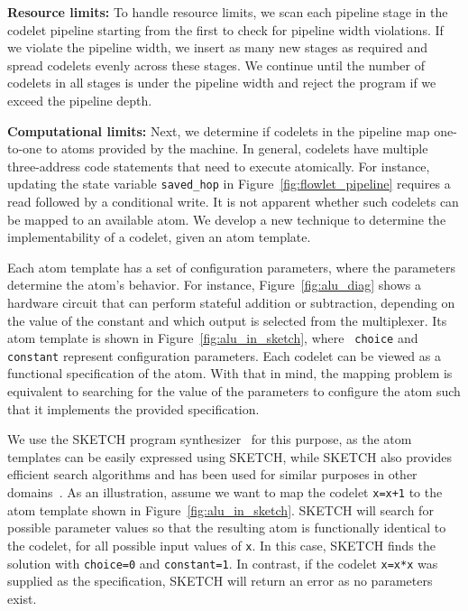 \textbf{Resource limits:} To handle resource limits, we scan each pipeline
stage in the codelet pipeline starting from the first to check for pipeline
width violations.  If we violate the pipeline width, we insert as many new
stages as required and spread codelets evenly across these stages.  We continue
until the number of codelets in all stages is under the pipeline width and
reject the program if we exceed the pipeline depth.

\textbf{Computational limits:} Next, we determine if codelets in the pipeline
map one-to-one to atoms provided by the \absmachine machine. In general,
codelets have multiple three-address code statements that need to execute
atomically. For instance, updating the state variable \texttt{saved\_hop} in
Figure~\ref{fig:flowlet_pipeline} requires a read followed by a conditional
write.  It is not apparent whether such codelets can be mapped to an available
atom. We develop a new technique to determine the implementability of a codelet,
given an atom template.

Each atom template has a set of configuration parameters, where the parameters
determine the atom's behavior.  For instance, Figure~\ref{fig:alu_diag} shows a
hardware circuit that can perform stateful addition or subtraction, depending
on the value of the constant and which output is selected from the multiplexer.
Its atom template is shown in Figure~\ref{fig:alu_in_sketch}, where {\tt
choice} and {\tt constant} represent configuration parameters.  Each codelet
can be viewed as a functional specification of the atom.  With that in mind,
the mapping problem is equivalent to searching for the value of the parameters
to configure the atom such that it implements the provided specification.

We use the SKETCH program synthesizer~\cite{sketch_asplos} for this purpose, as
the atom templates can be easily expressed using SKETCH, while SKETCH also
provides efficient search algorithms and has been used for similar purposes in
other domains~\cite{bitstreaming, lifejoin, qbs, chlorophyll}.  As an
illustration, assume we want to map the codelet {\tt x=x+1} to the atom
template shown in Figure~\ref{fig:alu_in_sketch}. SKETCH will search for
possible parameter values so that the resulting atom is functionally identical
to the codelet, for all possible input values of {\tt x}.  In this case, SKETCH
finds the solution with {\tt choice=0} and {\tt constant=1}.  In contrast, if
the codelet {\tt x=x*x} was supplied as the specification, SKETCH will return
an error as no parameters exist.

